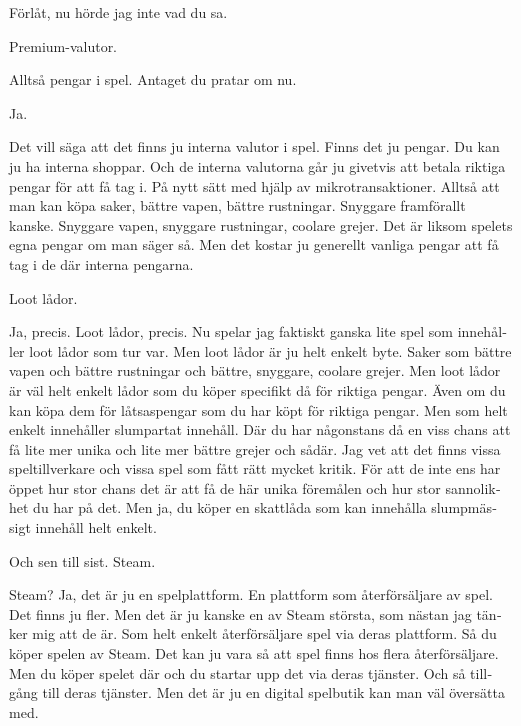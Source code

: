 \documentclass[11p]{article}
\begin{document}
\begin{otherlanguage}{swedish}
        \setlength{\leftskip}{1cm}
        Förlåt, nu hörde jag inte vad du sa.


        \setlength{\leftskip}{0cm}
        Premium-valutor.

        \setlength{\leftskip}{1cm}

        Alltså pengar i spel. Antaget du pratar om nu.


        \setlength{\leftskip}{0cm}
        Ja.

        \setlength{\leftskip}{1cm}

        Det vill säga att det finns ju interna valutor i spel. Finns det ju pengar. Du kan ju ha interna shoppar. Och de interna valutorna går ju givetvis att betala riktiga pengar för att få tag i.
        På nytt sätt med hjälp av mikrotransaktioner. Alltså att man kan köpa saker, bättre vapen, bättre rustningar. Snyggare framförallt kanske. Snyggare vapen, snyggare rustningar, coolare grejer.
        Det är liksom spelets egna pengar om man säger så. Men det kostar ju generellt vanliga pengar att få tag i de där interna pengarna.


        \setlength{\leftskip}{0cm}
        Loot lådor.


        \setlength{\leftskip}{1cm}
        Ja, precis. Loot lådor, precis. Nu spelar jag faktiskt ganska lite spel som innehåller loot lådor som tur var. Men loot lådor är ju helt enkelt byte.
        Saker som bättre vapen och bättre rustningar och bättre, snyggare, coolare grejer. Men loot lådor är väl helt enkelt lådor som du köper specifikt då för riktiga pengar.
        Även om du kan köpa dem för låtsaspengar som du har köpt för riktiga pengar. Men som helt enkelt innehåller slumpartat innehåll. Där du har någonstans då en viss chans att få lite mer unika och lite mer bättre grejer och sådär. Jag vet att det finns vissa speltillverkare och vissa spel som fått rätt mycket kritik. För att de inte ens har öppet hur stor chans det är att få de här unika föremålen och hur stor sannolikhet du har på det. Men ja, du köper en skattlåda som kan innehålla slumpmässigt innehåll helt enkelt.



        \setlength{\leftskip}{0cm}
        Och sen till sist. Steam.


        \setlength{\leftskip}{1cm}

        Steam? Ja, det är ju en spelplattform. En plattform som återförsäljare av spel. Det finns ju fler.
        Men det är ju kanske en av Steam största, som nästan jag tänker mig att de är. Som helt enkelt återförsäljare spel via deras plattform. Så du köper spelen av Steam.
        Det kan ju vara så att spel finns hos flera återförsäljare. Men du köper spelet där och du startar upp det via deras tjänster. Och så tillgång till deras tjänster.
        Men det är ju en digital spelbutik kan man väl översätta med.



\end{otherlanguage}
\end{document}
